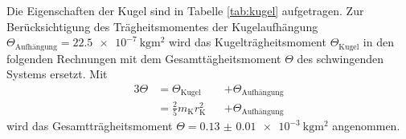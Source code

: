 \begin{figure}[H]
\centering
\begin{minipage}[t]{0.4\textwidth}
\centering


\end{minipage}
\hspace{5pt}
\begin{minipage}[t]{0.4\textwidth}
\centering


\end{minipage}
\end{figure}

Die Eigenschaften der Kugel sind in Tabelle \ref{tab:kugel} aufgetragen.
Zur Berücksichtigung des Trägheitsmomentes der Kugelaufhängung $\Theta_\text{Aufhängung}=\SI{22.5e-7}{\kilo\gram\meter\squared}$ \cite{V102} wird das Kugelträgheitsmoment $\Theta_\text{Kugel}$ in den folgenden Rechnungen mit dem Gesamttägheitsmoment $\Theta$ des schwingenden Systems ersetzt.
Mit 
\begin{alignat}{3}
	\Theta	&=\Theta_\text{Kugel} &&+\Theta_\text{Aufhängung}\label{eq:gesamttraegheit}\\ 
		&=\frac{2}{5} m_\text{K} r_\text{K}^2 &&+\Theta_\text{Aufhängung} %
\end{alignat}
wird das Gesamtträgheitsmoment $\Theta=\SI{0.13(1)e-3}{\kilo\gram\meter\squared}$ angenommen.
